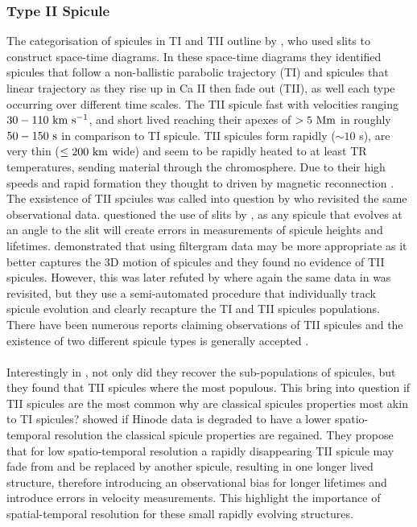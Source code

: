 \documentclass[12pt]{ociamthesis}
\newcommand{\kms}{~\rm{km ~s^{-1}}}
\newcommand{\np}{\\ \\}
\begin{document}
\subsubsection{Type II Spicule}
\label{subsec:TII}
The categorisation of spicules in TI and TII outline by \citep{Pontieu2007PASJ}, who used slits to construct space-time diagrams. In these space-time diagrams they identified spicules that follow a non-ballistic parabolic trajectory (TI) and spicules that linear trajectory as they rise up in Ca II then fade out (TII), as well each type occurring over different time scales. The TII spicule fast with velocities ranging $30-110\kms$, and short lived reaching their apexes of $>5~\rm{Mm}$ in roughly $50-150~\rm{s}$ in comparison to TI spicule. TII spicules form rapidly ($\sim 10$ s), are very thin ($\leq 200~\rm{km}$ wide) and seem to be rapidly heated to at least TR temperatures, sending material through the chromosphere. Due to their high speeds and rapid formation they thought to driven by magnetic reconnection \citep{Pontieu2007PASJ}. The exsistence of TII spciules was called into question by \cite{Zhang2012ApJ} who revisited the same observational data. \cite{Zhang2012ApJ} questioned the use of slits by \cite{Pontieu2007PASJ}, as any spicule that evolves at an angle to the slit will create errors in measurements of spicule heights and lifetimes. \cite{Zhang2012ApJ} demonstrated that using filtergram data may be more appropriate as it better captures the 3D motion of spicules and they found no evidence of TII spicules. However, this was later refuted by \cite{Pereira2012} where again the same data in \cite{Pontieu2007PASJ} was revisited, but they use a semi-automated procedure that individually track spicule evolution and clearly recapture the TI and TII spicules populations. There have been numerous reports claiming observations of TII spicules and the existence of two different spicule types is generally accepted \citep{Rouppe2009ApJ, Rouppe2015ApJ799L3R, Shetye2016AA589A3S, Rutten2019AA632A96R, Yurchyshyn2020ApJ891L21Y, Chintzoglou2021ApJ90682C}. \np   
%
Interestingly in \cite{Pereira2012}, not only did they recover the sub-populations of spicules, but they found that TII spicules where the most populous. This bring into question if TII spicules are the most common why are classical spicules properties most akin to TI spicules? \cite{Pereira2013ApJ76469P} showed if Hinode data is degraded to have a lower spatio-temporal resolution the classical spicule properties are regained. They propose that for low spatio-temporal resolution a rapidly disappearing TII spicule may fade from and be replaced by another spicule, resulting in one longer lived structure, therefore introducing an observational bias for longer lifetimes and introduce errors in velocity measurements. This highlight the importance of spatial-temporal resolution for these small rapidly evolving structures.\np
\end{document}
